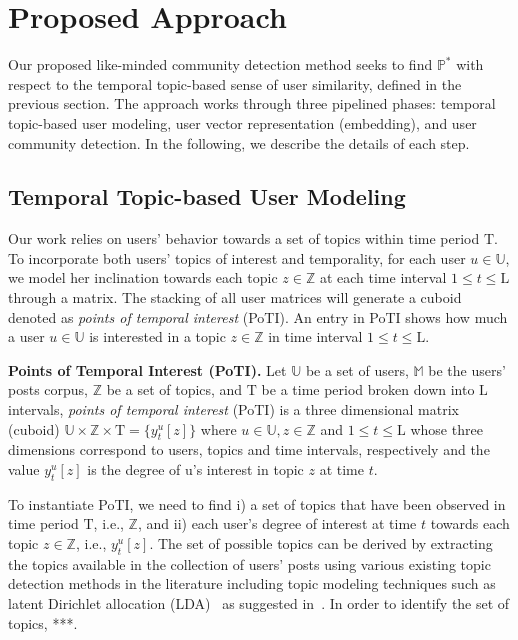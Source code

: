 \documentclass[sigconf]{acmart}
\begin{document}
\section{Proposed Approach}\label{approach}
Our proposed like-minded community detection method seeks to find $\mathbb{P}^*$ with respect to the temporal topic-based sense of user similarity, defined in the previous section. The approach works through three pipelined phases: temporal topic-based user modeling, user vector representation (embedding), and user community detection. In the following, we describe the details of each step.

\subsection{Temporal Topic-based User Modeling}\label{topic_detection}
Our work relies on users' behavior towards a set of topics within time period $\text{T}$. To incorporate both users' topics of interest and temporality, for each user $u\in\mathbb{U}$, we model her inclination towards each topic $z\in\mathbb{Z}$ at each time interval $1\leq{t}\leq\text{L}$ through a matrix. The stacking of all user matrices will generate a cuboid denoted as \textit{points of temporal interest} (PoTI). An entry in PoTI shows how much a user $u\in\mathbb{U}$ is interested in a topic $z\in\mathbb{Z}$ in time interval $1\leq{t}\leq\text{L}$.

\begin{definition}
\textbf{Points of Temporal Interest (PoTI).} Let $\mathbb{U}$ be a set of users, $\mathbb{M}$ be the users' posts corpus, $\mathbb{Z}$ be a set of topics, and $\text{T}$ be a time period broken down into $\text{L}$ intervals, \textit{points of temporal interest} (PoTI) is a three dimensional matrix (cuboid) $\mathbb{U}\times\mathbb{Z}\times\text{T}= \{y^u_t[z]\}$ where $u\in\mathbb{U},z\in\mathbb{Z}$ and $1\leq{t}\leq\text{L}$ whose three dimensions correspond to users, topics and time intervals, respectively and the value $y^u_t[z]$ is the degree of u's interest in topic $z$ at time $t$.
\end{definition}

To instantiate PoTI, we need to find i) a set of topics that have been observed in time period $\text{T}$, i.e., $\mathbb{Z}$, and ii) each user's degree of interest at time $t$ towards each topic $z\in\mathbb{Z}$, i.e., $y^u_t[z]$. The set of possible topics can be derived by extracting the topics available in the collection of users' posts using various existing topic detection methods in the literature including topic modeling techniques such as latent Dirichlet allocation (LDA)~\cite{DBLP:journals/jmlr/BleiNJ03} as suggested in~\cite{DBLP:conf/ecir/ZarrinkalamFBK17, DBLP:conf/ecir/ZarrinkalamFBK16}. In order to identify the set of topics, ***.
\end{document}

